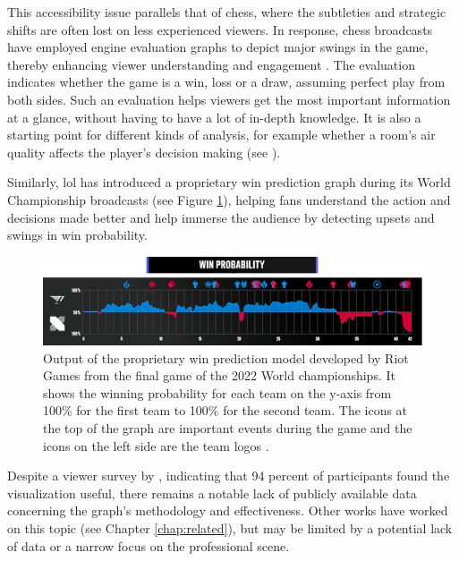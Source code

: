 \documentclass[12pt, a4paper, headinclude, twoside, plainheadsepline, open=right, numbers=noenddot, hidelinks, toc=listof, toc=bibliography]{scrreprt}
\begin{document}
This accessibility issue parallels that of chess, where the subtleties and strategic shifts are often lost on less experienced viewers. 
In response, chess broadcasts have employed engine evaluation graphs to depict major swings in the game, thereby enhancing viewer understanding and engagement \cite{zangAutomatedChessCommentator2019}.
The evaluation indicates whether the game is a win, loss or a draw, assuming perfect play from both sides.
Such an evaluation helps viewers get the most important information at a glance, without having to have a lot of in-depth knowledge.
It is also a starting point for different kinds of analysis, for example whether a room's air quality affects the player's decision making (see \cite{kunnIndoorAirQuality2023}).

Similarly, \ac{lol} has introduced a proprietary win prediction graph during its World Championship broadcasts (see Figure \ref{fig:riot_win_pred_graph}), helping fans understand the action and decisions made better and help immerse the audience by detecting upsets and swings in win probability.

\begin{figure}[htbp]
\centering
\includegraphics[width=\textwidth]{./images/win_prob_worlds.png}
\caption[Official win probability graph from World Championship 2022.]{Output of the proprietary win prediction model developed by Riot Games from the final game of the 2022 World championships. It shows the winning probability for each team on the y-axis from 100\% for the first team to 100\% for the second team. The icons at the top of the graph are important events during the game and the icons on the left side are the team logos \cite{LoLEsports}.}
\label{fig:riot_win_pred_graph}
\end{figure}

Despite a viewer survey by \citeauthor{claytorRiotGamesAWS2023} \cite{claytorRiotGamesAWS2023}, indicating that 94 percent of participants found the visualization useful, there remains a notable lack of publicly available data concerning the graph's methodology and effectiveness.
Other works have worked on this topic (see Chapter \ref{chap:related}), but may be limited by a potential lack of data or a narrow focus on the professional scene.
\end{document}
